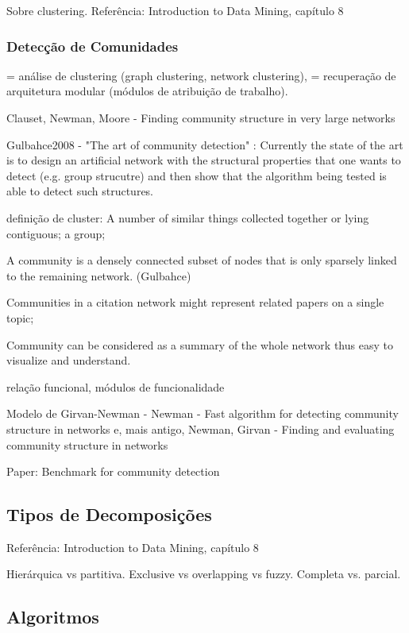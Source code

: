 \documentclass{article}
\begin{document}
Sobre clustering. Referência: Introduction to Data Mining, capítulo 8

\subsubsection{Detecção de Comunidades}

= análise de clustering (graph clustering, network clustering), = recuperação de arquitetura modular (módulos de atribuição de trabalho).

Clauset, Newman, Moore - Finding community structure in very large networks \cite{Clauset2004}

Gulbahce2008 - "The art of community detection" \cite{Gulbahce2008}: Currently the state of the art is to design an artificial network with the structural properties that one wants to detect (e.g. group strucutre) and then show that the algorithm being tested is able to detect such structures. 

definição de cluster: A number of similar things collected together or lying contiguous; a group;

A community is
a densely connected subset of nodes that is only sparsely
linked to the remaining network. (Gulbahce)

Communities in a citation network might represent
related papers on a single topic;

Community can be considered as a summary of
the whole network thus easy to visualize and
understand.

relação funcional, módulos de funcionalidade


Modelo de Girvan-Newman - Newman - Fast algorithm for detecting community structure in networks \cite{Newman2004b} e, mais antigo, Newman, Girvan - Finding and evaluating community structure in networks \cite{Newman2004a}

Paper: Benchmark for community detection \cite{Lancichinetti2008}


\subsection{Tipos de Decomposições}

Referência: Introduction to Data Mining, capítulo 8 \cite{Tan2005}

Hierárquica vs partitiva.
Exclusive vs overlapping vs fuzzy.
Completa vs. parcial.

\subsection{Algoritmos}
\end{document}

